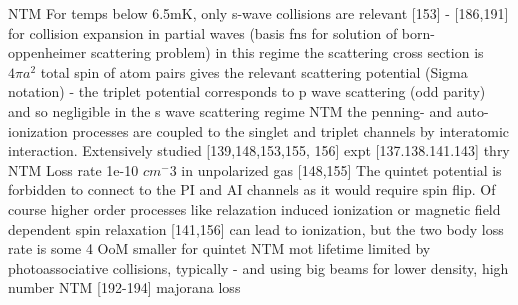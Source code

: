 


NTM For temps below 6.5mK, only s-wave collisions are relevant [153] - [186,191] for collision expansion in partial waves (basis fns for solution of born-oppenheimer scattering problem) 
	in this regime the scattering cross section is $4\pi a^2$
	total spin of atom pairs gives the relevant scattering potential (Sigma notation) - the triplet potential corresponds to p wave scattering (odd parity) and so negligible in the s wave scattering regime
	NTM the penning- and auto-ionization processes are coupled to the singlet and triplet channels by interatomic interaction. Extensively studied [139,148,153,155, 156] expt [137.138.141.143] thry 
	NTM Loss rate 1e-10 $cm^-3$ in unpolarized gas [148,155] 
	The quintet potential is forbidden to connect to the PI and AI channels as it would require  spin flip. Of course higher order processes like relazation induced ionization or magnetic field dependent spin relaxation [141,156] can lead to ionization, but the two body loss rate is some 4 OoM smaller for quintet
	NTM mot lifetime limited by photoassociative collisions, typically - and using big beams for lower density, high number 
	NTM [192-194] majorana loss 
